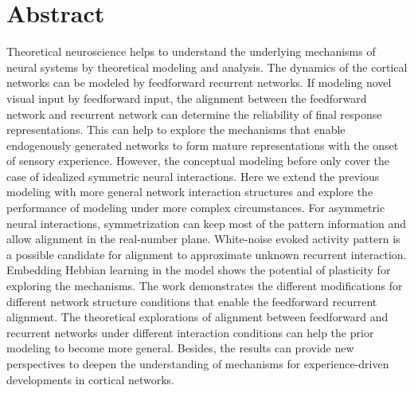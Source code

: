 \documentclass[11pt]{article}
\begin{document}
	
	\section*{Abstract}
	
	Theoretical neuroscience helps to understand the underlying mechanisms of neural systems by theoretical modeling and analysis. The dynamics of the cortical networks can be modeled by feedforward recurrent networks. If modeling novel visual input by feedforward input, the alignment between the feedforward network and recurrent network can determine the reliability of final response representations. This can help to explore the mechanisms that enable endogenously generated networks to form mature representations with the onset of sensory experience. However, the conceptual modeling before only cover the case of idealized symmetric neural interactions. Here we extend the previous modeling with more general network interaction structures and explore the performance of modeling under more complex circumstances.
	For asymmetric neural interactions, symmetrization can keep most of the pattern information and allow alignment in the real-number plane. White-noise evoked activity pattern is a possible candidate for alignment to approximate unknown recurrent interaction. Embedding Hebbian learning in the model shows the potential of plasticity for exploring the mechanisms. The work demonstrates the different modifications for different network structure conditions that enable the feedforward recurrent alignment. 
	The theoretical explorations of alignment between feedforward and recurrent networks under different interaction conditions can help the prior modeling to become more general. Besides, the results can provide new perspectives to deepen the understanding of mechanisms for experience-driven developments in cortical networks. 
\end{document}
